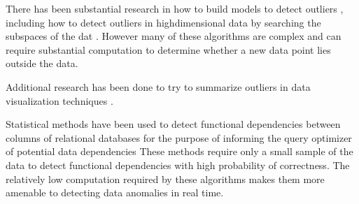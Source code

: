 
There has been substantial research in how to build models to detect outliers \cite{Aggarwal2013}, including how to detect outliers in high­dimensional data by searching the subspaces of the dat \cite{Zhang2004}\cite{Kriegel2009}.
However many of these algorithms are complex and can require substantial computation to determine whether a new data point lies outside the data.

Additional research has been done to try to summarize outliers in data visualization techniques \cite{Wu}.

Statistical methods have been used to detect functional dependencies between columns of relational databases for the purpose of informing the query optimizer of potential data dependencies \cite{Ilyas2004} 
These methods require only a small sample of the data to detect functional dependencies with high probability of correctness.
The relatively low computation required by these algorithms makes them more amenable to detecting data anomalies in real time.



